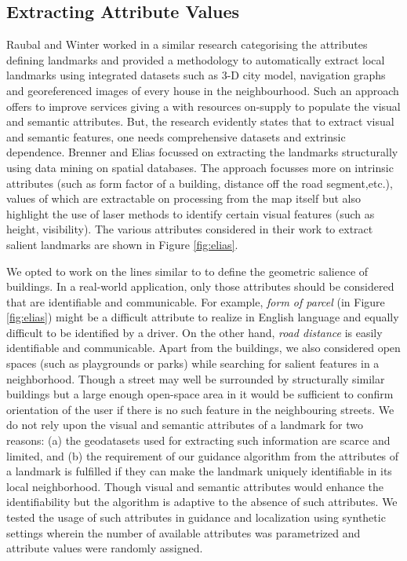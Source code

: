 \documentclass{iitkthesis}
\begin{document}
\subsection{Extracting Attribute Values}
Raubal and Winter \cite{raubal} worked in a similar research categorising the attributes defining landmarks and provided a methodology to automatically extract local landmarks using integrated datasets such as 3-D city model, navigation graphs and georeferenced images of every house in the neighbourhood. Such an approach offers to improve services giving a with resources on-supply to populate the visual and semantic attributes. But, the research evidently states that to extract visual and semantic features, one needs comprehensive datasets and extrinsic dependence. Brenner and Elias \cite{brenner} focussed on extracting the landmarks structurally using data mining on spatial databases. The approach focusses more on intrinsic attributes (such as form factor of a building, distance off the road segment,etc.), values of which are extractable on processing from the map itself but also highlight the use of laser methods to identify certain visual features (such as height, visibility). The various attributes considered in their work to extract salient landmarks are shown in Figure \ref{fig:elias}.

We opted to work on the lines similar to \cite{brenner} to define the geometric salience of buildings. In a real-world application, only those attributes should be considered that are identifiable and communicable. For example, \textit{form of parcel} (in Figure \ref{fig:elias}) might be a difficult attribute to realize in English language and equally difficult to be identified by a driver. On the other hand, \textit{road distance} is easily identifiable and communicable. Apart from the buildings, we also considered open spaces (such as playgrounds or parks) while searching for salient features in a neighborhood. Though a street may well be surrounded by structurally similar buildings but a large enough open-space area in it would be sufficient to confirm orientation of the user if there is no such feature in the neighbouring streets. We do not rely upon the visual and semantic attributes of a landmark for two reasons: (a) the geodatasets used for extracting such information are scarce and limited, and (b) the requirement of our guidance algorithm from the attributes of a landmark is fulfilled if they can make the landmark uniquely identifiable in its local neighborhood. Though visual and semantic attributes would enhance the identifiability but the algorithm is adaptive to the absence of such attributes. We tested the usage of such attributes in guidance and localization using synthetic settings wherein the number of available attributes was parametrized and attribute values were randomly assigned.
\end{document}
